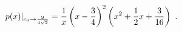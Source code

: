 \begin{equation}
p(x)|_{c_0\to {9\over 4\sqrt{2}}} = {1\over x}\left(x-{3\over 
4}\right)^2\left(x^2+{1\over 2}x + {3\over 16}\right)\ .
\label{polb}
\end{equation}

